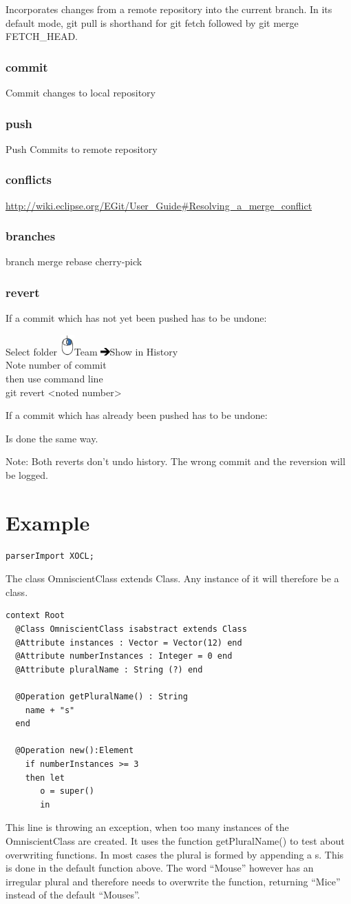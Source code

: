 \documentclass{scrreprt}
\newcommand{\rightMouse}{%
\includegraphics[width=15pt]{img/rightMouse.jpg}}
\newcommand{\rightArrow}{%
\includegraphics[width=10pt]{img/rightArrow.png}\hspace{1mm}}
\newcommand{\layerOne}[1]{\chapter{#1}}
\newcommand{\layerThree}[1]{\subsection{#1}}
\begin{document}
Incorporates changes from a remote repository into the current branch. 
In its default mode, git pull is shorthand for git fetch followed by git merge FETCH_HEAD.

\layerThree{commit}

Commit changes to local repository

\layerThree{push}

Push Commits to remote repository

\layerThree{conflicts}

\url{http://wiki.eclipse.org/EGit/User_Guide#Resolving_a_merge_conflict}

\layerThree{branches}
branch
merge
rebase
cherry-pick

\layerThree{revert}

If a commit which has not yet been pushed has to be undone:

Select folder \rightMouse Team \rightArrow Show in History \\
Note number of commit
\\ then use command line \\
{\ttfamily git revert <noted number>}

\vspace{5mm}
\noindent If a commit which has already been pushed has to be undone:

Is done the same way.

\vspace{5mm}
\noindent Note: Both reverts don't undo history. The wrong commit and the reversion will
be logged.

\layerOne{Example}

\begin{verbatim}
parserImport XOCL;

\end{verbatim}
The class {\ttfamily OmniscientClass} extends {\ttfamily Class}. Any instance of
it will therefore be a class.
\begin{verbatim}
context Root
  @Class OmniscientClass isabstract extends Class 
  @Attribute instances : Vector = Vector(12) end
  @Attribute numberInstances : Integer = 0 end
  @Attribute pluralName : String (?) end
  
  @Operation getPluralName() : String  
    name + "s"
  end
  
  @Operation new():Element
    if numberInstances >= 3 
    then let
       o = super()
       in
\end{verbatim}
This line is throwing an exception, when too many instances of the
OmniscientClass are created. It uses the function {\ttfamily getPluralName()} to
test about overwriting functions. In most cases the plural is formed by
appending a {\ttfamily s}. This is done in the default function above. The word ``Mouse''
however has an irregular plural and therefore needs to overwrite the function,
returning ``Mice'' instead of the default ``Mouses''.
\end{document}
